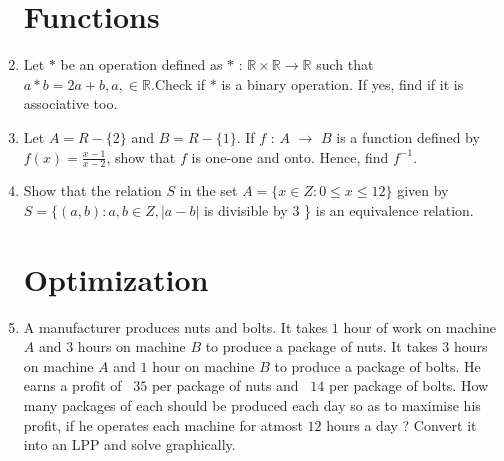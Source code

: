 \documentclass[10pt,-letter paper]{article}
\providecommand{\brak}[1]{\ensuremath{\left(#1\right)}}
\begin{document}
\begin{enumerate}
\section{Functions}

\item Let $*$ be an operation defined as $*$ : $\mathbb{R} \times \mathbb{R} \rightarrow \mathbb{R}$ such that $a * b = 2a + b,a, \in \mathbb{R}$.Check if $*$ is a binary operation. If yes, find if it is associative too.
\item Let $A = R - \{2\}$ and $B = R - \{1\}$. If $f$ : $A$ $\rightarrow$ $B$ is a function defined by $f\brak{x} = \frac{x - 1}{x - 2 }$, show that $f$ is one-one and onto. Hence, find $f^{-1}$.
\item Show that the relation $S$ in the set $A = \{x \in Z : 0  \le x  \le 12\}$ given by $S= \{\brak{a, b} : a, b \in Z, \vert{a-b}\vert $ is divisible by $ 3 $ \} is an equivalence relation.

\section{Optimization}

\item A manufacturer produces nuts and bolts. It takes $1$ hour of work on machine $A$ and $3$ hours on machine $B$ to produce a package of nuts. It takes $3$ hours on machine $A$ and $1$ hour on machine $B$ to produce a package of bolts. He earns a profit of \rupee~$35$ per package of nuts and \rupee~$14$ per package of bolts. How many packages of each should be produced each day so as to maximise his profit, if he operates each machine for atmost $12$ hours a day ? Convert it into an LPP and solve graphically.

\end{enumerate}
\end{document}
